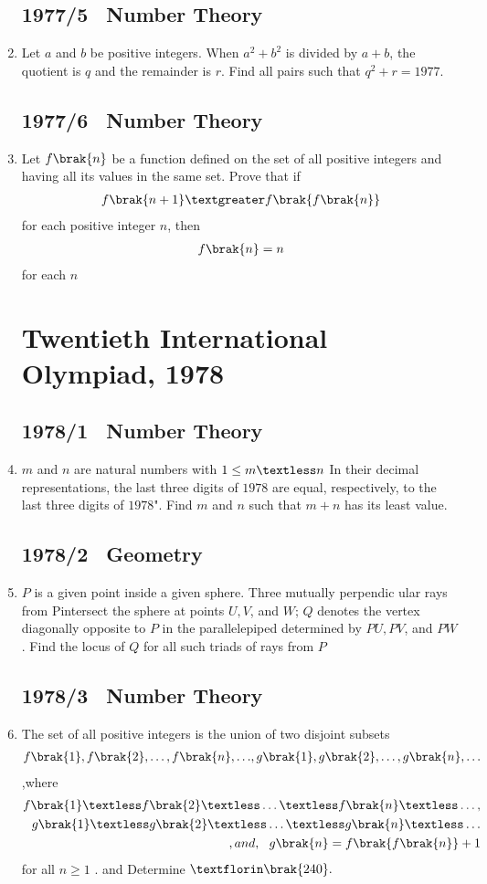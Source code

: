 \documentclass[12pt,-letter paper] {article}
\begin{document}
\begin{enumerate}
	\subsection*{1977/5 \ Number Theory}
\item Let $a$ and $b$ be positive integers. When $a^2 + b^2$ is divided by $a+b$, the quotient is $q$ and the remainder is $r$. Find all pairs  such that $q^2 + r = 1977.$ 
\subsection*{1977/6 \ Number Theory}
\item	Let $f\brak{n}$ be a function defined on the set of all positive integers and having all its values in the same set. Prove that if \begin{align}f\brak{n + 1} \textgreater f\brak{f\brak{n}}\end{align} for each positive integer $n$, then \begin{align}f\brak{n} = n\end{align} for each $n$
\newpage
	\section*{Twentieth International Olympiad, 1978}
		\subsection*{1978/1 \ Number Theory}
\item $m$ and $n$ are natural numbers with $1 \leq m \textless n$ In their decimal representations, the last three digits of $1978$ are equal, respectively, to the last three digits of $1978$". Find $m$ and $n$ such that $m+n$ has its least value.
	\subsection*{1978/2 \ Geometry}
\item $P$ is a given point inside a given sphere. Three mutually perpendic ular rays from Pintersect the sphere at points $U, V$, and $W$; $Q$ denotes the vertex diagonally opposite to $P$ in the parallelepiped determined by $PU, PV$, and $PW$. Find the locus of $Q$ for all such triads of rays from $P$
	\subsection*{1978/3 \ Number Theory}
\item The set of all positive integers is the union of two disjoint subsets 
\begin{align}
{f\brak{1}, f\brak{2} ,\ldots,f\brak{n},\ldots} ,{ g\brak{1},g\brak{2},\ldots,g\brak{n},\ldots} 
\end{align},where
\begin{align}
f\brak{1}\textless f\brak{2} \textless \ldots \textless f\brak{n} \textless \ldots,\\ g\brak{1} \textless g\brak{2} \textless \ldots \textless g\brak{n}\textless \ldots\\, and,\ \   g\brak{n}=f\brak{f\brak{n}} + 1
\end{align}
for all $n \geq 1$
. and Determine $ƒ\brak{240}.$

\end{enumerate}
\end{document}
